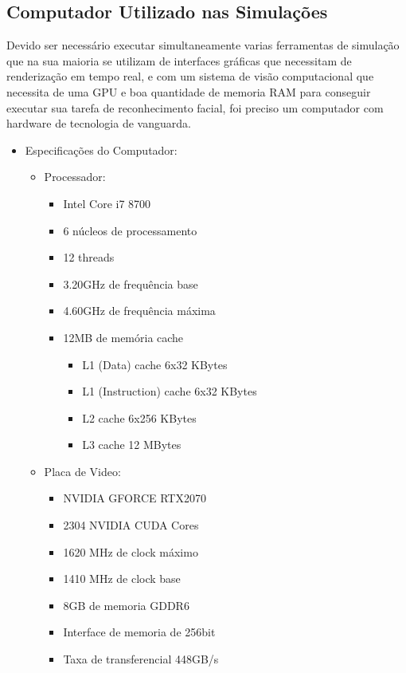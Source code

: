 \subsection{Computador Utilizado nas Simulações}
Devido ser necessário executar simultaneamente varias ferramentas de simulação que na sua maioria se utilizam de interfaces gráficas que necessitam de renderização em tempo real, e com um sistema de visão computacional que necessita de uma GPU e boa quantidade de memoria RAM para conseguir executar sua tarefa de reconhecimento facial, foi preciso um computador com hardware de tecnologia de vanguarda.

\begin{itemize}
	\item Especificações do Computador:
	\begin{itemize}
		\item Processador:
		\begin{itemize}
			\item Intel Core i7 8700
			\item 6 núcleos de processamento
			\item 12 threads
			\item 3.20GHz de frequência base
			\item 4.60GHz de frequência máxima
			\item 12MB de memória cache
			\begin{itemize}
				\item L1 (Data) cache 6x32 KBytes
				\item L1 (Instruction) cache 6x32 KBytes
				\item L2 cache 6x256 KBytes
				\item L3 cache 12 MBytes 
			\end{itemize}
		\end{itemize}
	\end{itemize}

	\begin{itemize}
		\item Placa de Video:
		\begin{itemize}
			\item NVIDIA GFORCE RTX2070
			\item 2304 NVIDIA CUDA Cores 
			\item 1620 MHz de clock máximo
			\item 1410 MHz de clock base
			\item 8GB de memoria GDDR6
			\item Interface de memoria de 256bit
			\item Taxa de transferencial 448GB/s 
		\end{itemize}
	\end{itemize}


\end{itemize}
